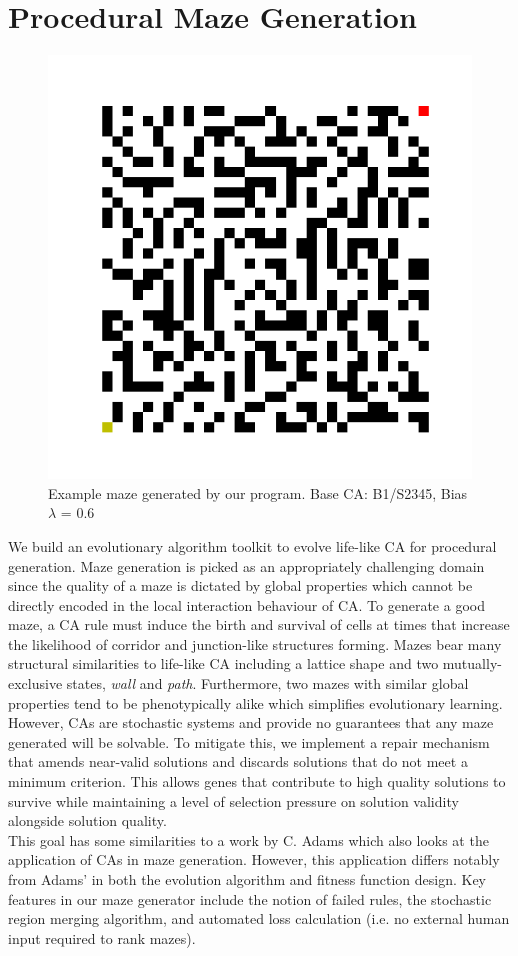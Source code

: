 \chapter{Procedural Maze Generation} \label{procedural}
\begin{figure}[!h]
\centering
    \includegraphics[width=.4\textwidth]{images/maze_example.png}
    \caption{Example maze generated by our program. Base CA: B1/S2345, Bias $\lambda$ = 0.6}
\label{fig:maze-example}
\end{figure}
We build an evolutionary algorithm toolkit to evolve life-like CA for procedural generation. Maze generation is picked as an appropriately challenging domain since the quality of a maze is dictated by global properties which cannot be directly encoded in the local interaction behaviour of CA. To generate a good maze, a CA rule must induce the birth and survival of cells at times that increase the likelihood of corridor and junction-like structures forming. Mazes bear many structural similarities to life-like CA including a lattice shape and two mutually-exclusive states, \textit{wall} and \textit{path}. Furthermore, two mazes with similar global properties tend to be phenotypically alike which simplifies evolutionary learning. However, CAs are stochastic systems and provide no guarantees that any maze generated will be solvable. To mitigate this, we implement a repair mechanism that amends near-valid solutions and discards solutions that do not meet a minimum criterion. This allows genes that contribute to high quality solutions to survive while maintaining a level of selection pressure on solution validity alongside solution quality.\\

This goal has some similarities to a work by C. Adams\cite{adams2018evolving} which also looks at the application of CAs in maze generation. However, this application differs notably from Adams' in both the evolution algorithm and fitness function design. Key features in our maze generator include the notion of failed rules, the stochastic region merging algorithm, and automated loss calculation (i.e. no external human input required to rank mazes).\\

